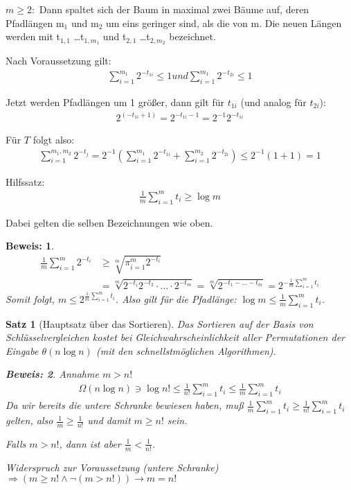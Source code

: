 \documentclass[ngerman,draft,parskip=half*,twoside]{scrreprt}
\theoremstyle{break}
\newtheorem{satz}{Satz}[chapter]
\theoremstyle{nonumberbreak}
\newtheorem{beweis}{Beweis:}
\begin{document}
$m \geq 2:$ Dann spaltet sich der Baum in maximal zwei Bäume auf, deren Pfadlängen m$_1$ und m$_2$ um eins geringer sind, als die
von m. Die neuen Längen werden mit t$_{1,1}$ \ldots t$_{1,m_1}$ und t$_{2,1}$ \ldots t$_{2,m_2}$ bezeichnet.


Nach Voraussetzung gilt:
\begin{gather*}
\sum_{i=1}^{m_{1}} 2^{-t_{1i}}\leq 1und  \sum_{i=1}^{m_{1}} 2^{-t_{2i}}\leq 1
\end{gather*}

Jetzt werden Pfadlängen um 1 größer, dann gilt für $t_{1i}$ (und analog für $t_{2i}$):
\begin{gather*}
2^{(-t_{1i}+1)}=2^{-t_{1i}-1}=2^{-1} 2^{-t_{1i}}
\end{gather*}

Für $T$ folgt also:
\begin{gather*}
\sum_{i=1}^{m_1,  m_2} 2^{-t_{j}}=2^{-1}(\sum_{i=1}^{m_{1}} 2^{-t_{1i}}+\sum_{i=1}^{m_{2}} 2^{-t_{2i}})
\leq 2^{-1}(1+1)=1
\end{gather*}

Hilfssatz:
\begin{gather*}
\frac{1}{m}  \sum_{i=1}^{m}t_{i}\geq \log m
\end{gather*}

Dabei gelten die selben Bezeichnungen wie oben.
\begin{beweis}
  \begin{align*}
    \frac{1}{m} \sum_{i=1}^{m} 2^{-t_{i}} &\geq \sqrt[m]{\pi_{i=1}^{m}
      2^{-t_{i}}}\\
    &=\sqrt[m]{2^{-t_i} 2^{-t_2}\cdot \ldots \cdot 2^{-t_m}} =
    \sqrt[m]{2^{-t_1-\dotsc -t_m}}= 2^{-\frac{1}{m}\sum_{i=1}^{m}t_i}
  \end{align*}
  Somit folgt, $m \leq 2^{\frac{1}{m} \sum_{i=1}^{m}t_i}$. Also gilt
  für die Pfadlänge: $\log m \leq\frac{1}{m}\sum_{i=1}^{m} t_i$.
\end{beweis}

\begin{satz}[Hauptsatz über das Sortieren]
  Das Sortieren auf der Basis von Schlüsselvergleichen kostet bei
  Gleichwahrscheinlichkeit aller Permutationen der Eingabe $\theta
  (n\log n)$ (mit den schnellstmöglichen Algorithmen).
  \begin{beweis}
    Annahme $m>n!$
    \begin{gather*}
      \Omega(n  \log n) \ni \log n!\leq\frac{1}{n!}  \sum_{i=1}^{m}t_i \leq\frac{1}{m}  \sum_{i=1}^{m}t_i
    \end{gather*}
    Da wir bereits die untere Schranke bewiesen haben, muß
    $\frac{1}{m} \sum_{i=1}^{m}t_i \geq \frac{1}{n!}
    \sum_{i=1}^{m}t_i$ gelten, also $\frac{1}{m} \geq \frac{1}{n!}$
    und damit $m \geq n!$ sein.

    Falls $m>n!$, dann ist aber $\frac{1}{m} < \frac{1}{n!}$.

    Widerspruch zur Voraussetzung (untere Schranke) $\Rightarrow (m
    \geq n! \wedge \lnot (m>n!)) \rightarrow m=n!$
\end{beweis}
\end{satz}
\end{document}
